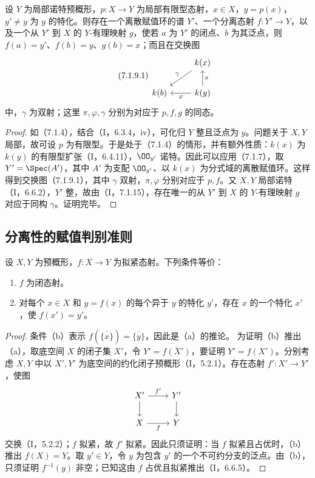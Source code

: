 设 $Y$ 为局部诺特预概形，$p:X\to Y$ 为局部有限型态射，$x\in X$，$y=p(x)$，$y'\ne y$ 为 $y$ 的特化。则存在一个离散赋值环的谱 $Y'$、一个分离态射 $f:Y'\to Y$，以及一个从 $Y'$ 到 $X$ 的 $Y$-有理映射 $g$，使若 $a$ 为 $Y'$ 的闭点、$b$ 为其泛点，则 $f(a)=y'$、$f(b)=y$、$g(b)=x$；而且在交换图
\begin{equation}\tag{7.1.9.1}
\begin{tikzcd}
&k(x)\arrow[dl,"\gamma"']\\
k(b)&k(y)\arrow[l,"\varphi"]\arrow[u,"\pi"']
\end{tikzcd}
\end{equation}
中，$\gamma$ 为双射；这里 $\pi,\varphi,\gamma$ 分别为对应于 $p,f,g$ 的同态。
\begin{proof}
如（7.1.4），结合（I，6.3.4，iv），可化归 $Y$ 整且泛点为 $y$。问题关于 $X,Y$ 局部，故可设 $p$ 为有限型。于是处于（7.1.4）的情形，并有额外性质：$k(x)$ 为 $k(y)$ 的有限型扩张（I，6.4.11），$\OO_{y'}$ 诺特。因此可以应用（7.1.7），取 $Y'=\Spec(A')$，其中 $A'$ 为支配 $\OO_{y'}$、以 $k(x)$ 为分式域的离散赋值环。这样得到交换图（7.1.9.1），其中 $\gamma$ 双射，$\pi,\varphi$ 分别对应于 $p,f$。又 $X,Y$ 局部诺特（I，6.6.2），$Y'$ 整，故由（I，7.1.15），存在唯一的从 $Y'$ 到 $X$ 的 $Y$-有理映射 $g$ 对应于同构 $\gamma$。证明完毕。
\end{proof}

\subsection{分离性的赋值判别准则}

设 $X,Y$ 为预概形，$f:X\to Y$ 为拟紧态射。下列条件等价：
\begin{enumerate}[label=\alph*)]
\item $f$ 为闭态射。
\item 对每个 $x\in X$ 和 $y=f(x)$ 的每个异于 $y$ 的特化 $y'$，存在 $x$ 的一个特化 $x'$，使 $f(x')=y'$。
\end{enumerate}
\begin{proof}
条件（b）表示 $f(\overline{\{x\}})=\overline{\{y\}}$，因此是（a）的推论。
为证明（b）推出（a），取底空间 $X$ 的闭子集 $X'$，令 $Y'=\overline{f(X')}$，要证明 $Y'=f(X')$。分别考虑 $X,Y$ 中以 $X',Y'$ 为底空间的约化闭子预概形（I，5.2.1）。存在态射 $f':X'\to Y'$，使图
\[
\begin{tikzcd}
X'\arrow[r,"f'"]\arrow[d]&Y'\arrow[d]\\
X\arrow[r,"f"']&Y
\end{tikzcd}
\]
交换（I，5.2.2）；$f$ 拟紧，故 $f'$ 拟紧。因此只须证明：当 $f$ 拟紧且占优时，（b）推出 $f(X)=Y$。取 $y'\in Y$，令 $y$ 为包含 $y'$ 的一个不可约分支的泛点。由（b），只须证明 $f^{-1}(y)$ 非空；已知这由 $f$ 占优且拟紧推出（I，6.6.5）。
\end{proof}

